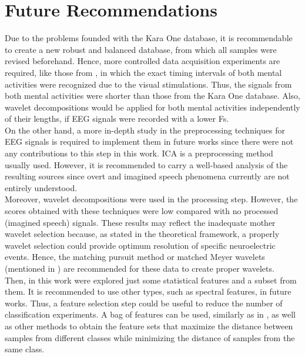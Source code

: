 \section{Future Recommendations}
Due to the problems founded with the Kara One database, it is recommendable to create a new robust and balanced database, from which all samples were revised beforehand. Hence, more controlled data acquisition experiments are required, like those from \cite{stephanie}, in which the exact timing intervals of both mental activities were recognized due to the visual stimulations. Thus, the signals from both mental activities were shorter than those from the Kara One database. Also, wavelet decompositions would be applied for both mental activities independently of their lengths, if EEG signals were recorded with a lower Fs.\\

On the other hand, a more in-depth study in the preprocessing techniques for EEG signals is required to implement them in future works since there were not any contributions to this step in this work. ICA \cite{makeig1996independent} is a preprocessing method usually used. However, it is recommended to carry a well-based analysis of the resulting sources since overt and imagined speech phenomena currently are not entirely understood.\\

Moreover, wavelet decompositions were used in the processing step. However, the scores obtained with these techniques were low compared with no processed (imagined speech) signals. These results may reflect the inadequate mother wavelet selection because, as stated in the theoretical framework, a properly wavelet selection could provide optimum resolution of specific neuroelectric events. Hence, the matching pursuit method or matched Meyer wavelets (mentioned in \cite{samar1999wavelet}) are recommended for these data to create proper wavelets.\\

Then, in this work were explored just some statistical features and a subset from them. It is recommended to use other types, such as spectral features, in future works. Thus, a feature selection step could be useful to reduce the number of classification experiments. A bag of features can be used, similarly as in \cite{salinas2017bag}, as well as other methods to obtain the feature sets that maximize the distance between samples from different classes while minimizing the distance of samples from the same class.\\


